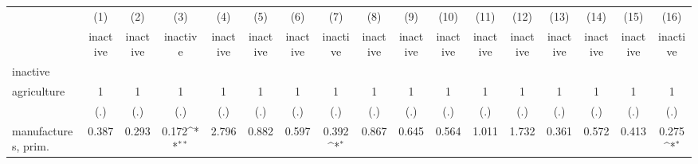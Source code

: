 {
\def\sym#1{\ifmmode^{#1}\else\(^{#1}\)\fi}
\begin{tabular}{l*{16}{c}}
\hline\hline
                    &\multicolumn{1}{c}{(1)}&\multicolumn{1}{c}{(2)}&\multicolumn{1}{c}{(3)}&\multicolumn{1}{c}{(4)}&\multicolumn{1}{c}{(5)}&\multicolumn{1}{c}{(6)}&\multicolumn{1}{c}{(7)}&\multicolumn{1}{c}{(8)}&\multicolumn{1}{c}{(9)}&\multicolumn{1}{c}{(10)}&\multicolumn{1}{c}{(11)}&\multicolumn{1}{c}{(12)}&\multicolumn{1}{c}{(13)}&\multicolumn{1}{c}{(14)}&\multicolumn{1}{c}{(15)}&\multicolumn{1}{c}{(16)}\\
                    &\multicolumn{1}{c}{inactive}&\multicolumn{1}{c}{inactive}&\multicolumn{1}{c}{inactive}&\multicolumn{1}{c}{inactive}&\multicolumn{1}{c}{inactive}&\multicolumn{1}{c}{inactive}&\multicolumn{1}{c}{inactive}&\multicolumn{1}{c}{inactive}&\multicolumn{1}{c}{inactive}&\multicolumn{1}{c}{inactive}&\multicolumn{1}{c}{inactive}&\multicolumn{1}{c}{inactive}&\multicolumn{1}{c}{inactive}&\multicolumn{1}{c}{inactive}&\multicolumn{1}{c}{inactive}&\multicolumn{1}{c}{inactive}\\
\hline
inactive            &                     &                     &                     &                     &                     &                     &                     &                     &                     &                     &                     &                     &                     &                     &                     &                     \\
agriculture         &           1         &           1         &           1         &           1         &           1         &           1         &           1         &           1         &           1         &           1         &           1         &           1         &           1         &           1         &           1         &           1         \\
                    &         (.)         &         (.)         &         (.)         &         (.)         &         (.)         &         (.)         &         (.)         &         (.)         &         (.)         &         (.)         &         (.)         &         (.)         &         (.)         &         (.)         &         (.)         &         (.)         \\
[1em]
manufactures, prim. &       0.387         &       0.293         &       0.172\sym{**} &       2.796         &       0.882         &       0.597         &       0.392\sym{*}  &       0.867         &       0.645         &       0.564         &       1.011         &       1.732         &       0.361         &       0.572         &       0.413         &       0.275\sym{*}  \\

\end{tabular}}
